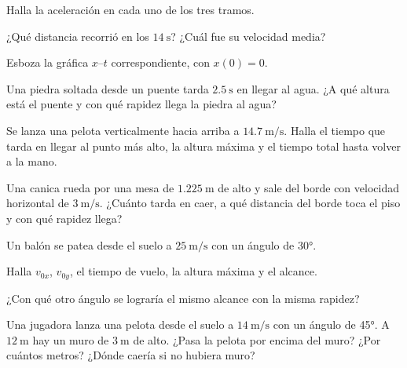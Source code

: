 \documentclass[11pt,a4paper]{article}
\begin{document}
\begin{ejercicios}
  \begin{center}
  \end{center}
  \begin{ejercicios}
  \item Halla la aceleración en cada uno de los tres tramos.
  \item ¿Qué distancia recorrió en los $\SI{14}{\second}$? ¿Cuál fue su velocidad media?
  \item Esboza la gráfica $x$--$t$ correspondiente, con $x(0)=0$.
  \end{ejercicios}
\item Una piedra soltada desde un puente tarda $\SI{2.5}{\second}$ en llegar al agua. ¿A qué altura está el puente y con
  qué rapidez llega la piedra al agua?
\item Se lanza una pelota verticalmente hacia arriba a $\SI{14.7}{\meter\per\second}$. Halla el tiempo que tarda en llegar
  al punto más alto, la altura máxima y el tiempo total hasta volver a la mano.
\item Una canica rueda por una mesa de $\SI{1.225}{\meter}$ de alto y sale del borde con velocidad horizontal de
  $\SI{3}{\meter\per\second}$. ¿Cuánto tarda en caer, a qué distancia del borde toca el piso y con qué rapidez llega?
\item Un balón se patea desde el suelo a $\SI{25}{\meter\per\second}$ con un ángulo de \ang{30}.
  \begin{ejercicios}
  \item Halla $v_{0x}$, $v_{0y}$, el tiempo de vuelo, la altura máxima y el alcance.
  \item ¿Con qué otro ángulo se lograría el mismo alcance con la misma rapidez?
  \end{ejercicios}
\item Una jugadora lanza una pelota desde el suelo a $\SI{14}{\meter\per\second}$ con un ángulo de \ang{45}. A
  $\SI{12}{\meter}$ hay un muro de $\SI{3}{\meter}$ de alto. ¿Pasa la pelota por encima del muro? ¿Por cuántos metros?
  ¿Dónde caería si no hubiera muro?
\end{ejercicios}
\end{document}

